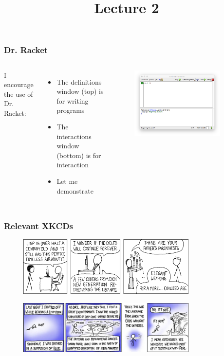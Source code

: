 \documentclass{beamer}
\title{Lecture 2}
\begin{document}
\begin{frame}
\titlepage
\end{frame}

\begin{frame}
  \frametitle{Dr. Racket}
  \begin{columns}
    I encourage the use of Dr. Racket:
    \begin{itemize}
    \item<1-> The definitions window (top) is for writing programs
    \item<2-> The interactions window (bottom) is for interaction
    \item<3-> Let me demonstrate 
    \end{itemize}
    \begin{figure}
      \centering \includegraphics[width=0.9\textwidth]{images/drracket-plain.png}
    \end{figure}
  \end{columns}
\end{frame}

\begin{frame}
  \frametitle{Relevant XKCDs}
  \begin{figure}
    \centering \includegraphics[width=0.8\textwidth]{images/lisp_cycles.png}
  \end{figure}    
  \begin{figure}
    \centering \includegraphics[width=0.8\textwidth]{images/lisp.jpg}
  \end{figure}    
\end{frame}
\end{document}
